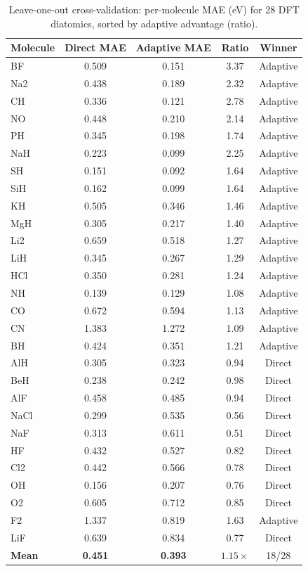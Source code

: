 \documentclass[aps,prb,twocolumn,superscriptaddress,longbibliography,floatfix]{revtex4-2}
\begin{document}
\begin{table}[h]
  \caption{Leave-one-out cross-validation: per-molecule MAE (eV) for 28 DFT diatomics, sorted by adaptive advantage (ratio).}
  \label{tab:dft_loo}
  \begin{ruledtabular}
  \begin{tabular}{lcccc}
    Molecule & Direct MAE & Adaptive MAE & Ratio & Winner \\
    \hline
    BF   & 0.509 & 0.151 & 3.37 & Adaptive \\
    Na2  & 0.438 & 0.189 & 2.32 & Adaptive \\
    CH   & 0.336 & 0.121 & 2.78 & Adaptive \\
    NO   & 0.448 & 0.210 & 2.14 & Adaptive \\
    PH   & 0.345 & 0.198 & 1.74 & Adaptive \\
    NaH  & 0.223 & 0.099 & 2.25 & Adaptive \\
    SH   & 0.151 & 0.092 & 1.64 & Adaptive \\
    SiH  & 0.162 & 0.099 & 1.64 & Adaptive \\
    KH   & 0.505 & 0.346 & 1.46 & Adaptive \\
    MgH  & 0.305 & 0.217 & 1.40 & Adaptive \\
    Li2  & 0.659 & 0.518 & 1.27 & Adaptive \\
    LiH  & 0.345 & 0.267 & 1.29 & Adaptive \\
    HCl  & 0.350 & 0.281 & 1.24 & Adaptive \\
    NH   & 0.139 & 0.129 & 1.08 & Adaptive \\
    CO   & 0.672 & 0.594 & 1.13 & Adaptive \\
    CN   & 1.383 & 1.272 & 1.09 & Adaptive \\
    BH   & 0.424 & 0.351 & 1.21 & Adaptive \\
    AlH  & 0.305 & 0.323 & 0.94 & Direct \\
    BeH  & 0.238 & 0.242 & 0.98 & Direct \\
    AlF  & 0.458 & 0.485 & 0.94 & Direct \\
    NaCl & 0.299 & 0.535 & 0.56 & Direct \\
    NaF  & 0.313 & 0.611 & 0.51 & Direct \\
    HF   & 0.432 & 0.527 & 0.82 & Direct \\
    Cl2  & 0.442 & 0.566 & 0.78 & Direct \\
    OH   & 0.156 & 0.207 & 0.76 & Direct \\
    O2   & 0.605 & 0.712 & 0.85 & Direct \\
    F2   & 1.337 & 0.819 & 1.63 & Adaptive \\
    LiF  & 0.639 & 0.834 & 0.77 & Direct \\
    \hline
    \textbf{Mean} & \textbf{0.451} & \textbf{0.393} & $\mathbf{1.15\times}$ & 18/28 \\
  \end{tabular}
  \end{ruledtabular}
\end{table}
\end{document}
